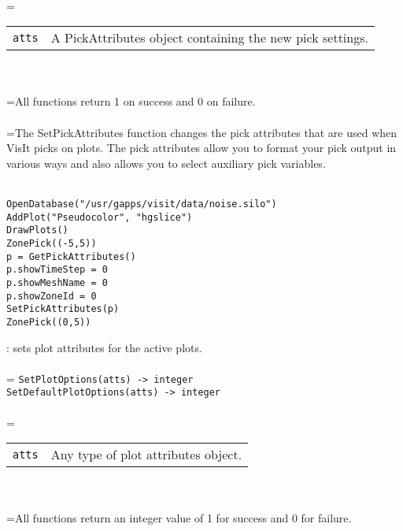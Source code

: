 \documentclass[10pt,a4paper]{report}
\begin{document}
 \\ 
\hangindent=\parindent 
\begin{tabular}{lp{9cm}}
\verb!atts! & A PickAttributes object containing the new pick settings. \\
\end{tabular} \\[-2mm]


 \\ 
\hangindent=\parindent All functions return 1 on success and 0 on failure. \\[-3mm] 

 \\ 
\hangindent=\parindent The SetPickAttributes function changes the pick attributes that are used when VisIt picks on plots. The pick attributes allow you to format your pick output in various ways and also allows you to select auxiliary pick variables. \\[-3mm] 

\\[-6mm]
\begin{verbatim}OpenDatabase("/usr/gapps/visit/data/noise.silo")
AddPlot("Pseudocolor", "hgslice")
DrawPlots()
ZonePick((-5,5))
p = GetPickAttributes()
p.showTimeStep = 0
p.showMeshName = 0
p.showZoneId = 0
SetPickAttributes(p)
ZonePick((0,5))
\end{verbatim}
\newpage


{}
: sets plot attributes for the active plots.\\[-3mm]

 \\ 
\hangindent=\parindent 
\verb!SetPlotOptions(atts) -> integer!\\ 
\verb!SetDefaultPlotOptions(atts) -> integer!\\ [-3mm]

 \\ 
\hangindent=\parindent 
\begin{tabular}{ll}
\verb!atts! & Any type of plot attributes object. \\
\end{tabular} \\[-2mm]


 \\ 
\hangindent=\parindent All functions return an integer value of 1 for success and 0 for failure. \\[-3mm] 
\end{document}
